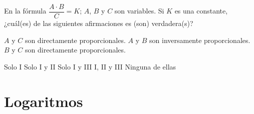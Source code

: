 \documentclass[pagina vacia]{srs}
\begin{document}
\begin{preguntas}
\pregunta En la fórmula $\dfrac{A\cdot B}{C}=K$; $A$, $B$ y $C$ son variables. Si $K$ es una constante, ¿cuál(es) de las siguientes afirmaciones es (son) verdadera(s)?
\begin{verticali}
\alternativa $A$ y $C$ son directamente proporcionales.
\alternativa $A$ y $B$ son inversamente proporcionales.
\alternativa $B$ y $C$ son directamente proporcionales.
\end{verticali}
\begin{vertical}
\alternativa Solo I
\alternativa Solo I y II
\alternativa Solo I y III
\alternativa I, II y III
\alternativa Ninguna de ellas
\end{vertical}

\end{preguntas}


\section{Logaritmos}
\end{document}
